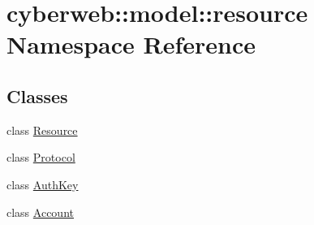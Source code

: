 \hypertarget{namespacecyberweb_1_1model_1_1resource}{\section{cyberweb\-:\-:model\-:\-:resource \-Namespace \-Reference}
\label{namespacecyberweb_1_1model_1_1resource}
}
\subsection*{\-Classes}
\begin{DoxyCompactItemize}
\item 
class \hyperlink{classcyberweb_1_1model_1_1resource_1_1_resource}{\-Resource}
\item 
class \hyperlink{classcyberweb_1_1model_1_1resource_1_1_protocol}{\-Protocol}
\item 
class \hyperlink{classcyberweb_1_1model_1_1resource_1_1_auth_key}{\-Auth\-Key}
\item 
class \hyperlink{classcyberweb_1_1model_1_1resource_1_1_account}{\-Account}
\end{DoxyCompactItemize}
